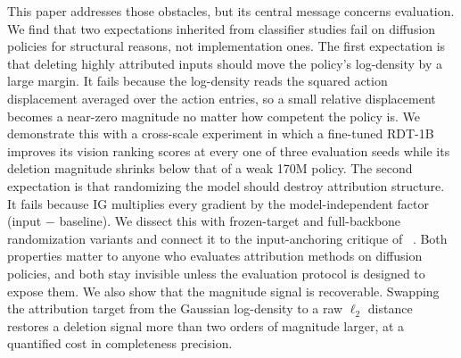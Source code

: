 \documentclass{article}
\begin{document}
This paper addresses those obstacles, but its central message concerns evaluation.
We find that two expectations inherited from classifier studies fail on diffusion policies for structural reasons, not implementation ones.
The first expectation is that deleting highly attributed inputs should move the policy's log-density by a large margin.
It fails because the log-density reads the squared action displacement averaged over the action entries, so a small relative displacement becomes a near-zero magnitude no matter how competent the policy is.
We demonstrate this with a cross-scale experiment in which a fine-tuned RDT-1B improves its vision ranking scores at every one of three evaluation seeds while its deletion magnitude shrinks below that of a weak 170M policy.
The second expectation is that randomizing the model should destroy attribution structure.
It fails because IG multiplies every gradient by the model-independent factor (input $-$ baseline).
We dissect this with frozen-target and full-backbone randomization variants and connect it to the input-anchoring critique of \citeauthor{adebayo2018sanity}~.
Both properties matter to anyone who evaluates attribution methods on diffusion policies, and both stay invisible unless the evaluation protocol is designed to expose them.
We also show that the magnitude signal is recoverable.
Swapping the attribution target from the Gaussian log-density to a raw $\ell_2$ distance restores a deletion signal more than two orders of magnitude larger, at a quantified cost in completeness precision.
\end{document}
